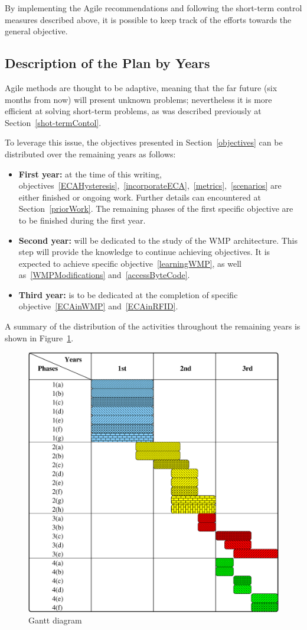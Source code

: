 By implementing the Agile recommendations and following the short-term control measures described above, it is possible to keep track of the efforts towards the general objective.

\subsection{Description of the Plan by Years}\label{planByYears}
Agile methods are thought to be adaptive, meaning that the far future (six months from now) will present unknown problems; nevertheless it is more efficient at solving short-term problems, as was described previously at Section~\ref{shot-termContol}.

To leverage this issue, the objectives presented in Section~\ref{objectives} can be distributed over the remaining years as follows:

\begin{itemize}
	\item {\bfseries First year:} at the time of this writing, objectives~\ref{ECAHysteresis},~\ref{incorporateECA},~\ref{metrics},~\ref{scenarios} are either finished or ongoing work. Further details can encountered at Section~\ref{priorWork}. The remaining phases of the first specific objective are to be finished during the first year.
	\item {\bfseries Second year:} will be dedicated to the study of the WMP architecture. This step will provide the knowledge to continue achieving objectives. It is expected to achieve specific objective~\ref{learningWMP}, as well as~\ref{WMPModifications} and~\ref{accessByteCode}.
	\item {\bfseries Third year:} is to be dedicated at the completion of specific objective~\ref{ECAinWMP} and~\ref{ECAinRFID}.
\end{itemize}

A summary of the distribution of the activities throughout the remaining years is shown in Figure~\ref{fig:gantt}.

\begin{figure}[htbp]
  \centering
  \includegraphics[width=\linewidth]{gantt.eps}
  \caption{Gantt diagram
  \label{fig:gantt}}
\end{figure}